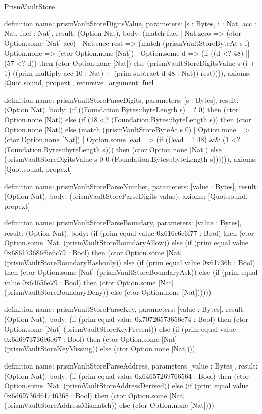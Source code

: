 \begin{lexlean}{PrismVaultStore}
\begin{semanticmodule}
definition{
  name: prismVaultStoreDigitsValue,
  parameters: [s : Bytes, i : Nat, acc : Nat, fuel : Nat],
  result: (Option Nat),
  body: (match fuel
    | Nat.zero => (ctor Option.some [Nat] acc)
    | Nat.succ rest => (match (prismVaultStoreByteAt s i)
      | Option.none => (ctor Option.none [Nat])
      | Option.some d => (if ((d <? 48) || (57 <? d)) then (ctor Option.none [Nat]) else (prismVaultStoreDigitsValue s (i + 1) ((prim multiply acc 10 : Nat) + (prim subtract d 48 : Nat)) rest)))),
  axioms: [Quot.sound, propext],
  recursive_argument: fuel
}

definition{
  name: prismVaultStoreParseDigits,
  parameters: [s : Bytes],
  result: (Option Nat),
  body: (if ((Foundation.Bytes::byteLength s) =? 0) then (ctor Option.none [Nat]) else (if (18 <? (Foundation.Bytes::byteLength s)) then (ctor Option.none [Nat]) else (match (prismVaultStoreByteAt s 0)
    | Option.none => (ctor Option.none [Nat])
    | Option.some lead => (if ((lead =? 48) && (1 <? (Foundation.Bytes::byteLength s))) then (ctor Option.none [Nat]) else (prismVaultStoreDigitsValue s 0 0 (Foundation.Bytes::byteLength s)))))),
  axioms: [Quot.sound, propext]
}

definition{
  name: prismVaultStoreParseNumber,
  parameters: [value : Bytes],
  result: (Option Nat),
  body: (prismVaultStoreParseDigits value),
  axioms: [Quot.sound, propext]
}

definition{
  name: prismVaultStoreParseBoundary,
  parameters: [value : Bytes],
  result: (Option Nat),
  body: (if (prim equal value 0x616c6c6f77 : Bool) then (ctor Option.some [Nat] (prismVaultStoreBoundaryAllow)) else (if (prim equal value 0x686173686f6e6c79 : Bool) then (ctor Option.some [Nat] (prismVaultStoreBoundaryHashonly)) else (if (prim equal value 0x61736b : Bool) then (ctor Option.some [Nat] (prismVaultStoreBoundaryAsk)) else (if (prim equal value 0x64656e79 : Bool) then (ctor Option.some [Nat] (prismVaultStoreBoundaryDeny)) else (ctor Option.none [Nat])))))
}

definition{
  name: prismVaultStoreParseKey,
  parameters: [value : Bytes],
  result: (Option Nat),
  body: (if (prim equal value 0x70726573656e74 : Bool) then (ctor Option.some [Nat] (prismVaultStoreKeyPresent)) else (if (prim equal value 0x6d697373696e67 : Bool) then (ctor Option.some [Nat] (prismVaultStoreKeyMissing)) else (ctor Option.none [Nat])))
}

definition{
  name: prismVaultStoreParseAddress,
  parameters: [value : Bytes],
  result: (Option Nat),
  body: (if (prim equal value 0x64657269766564 : Bool) then (ctor Option.some [Nat] (prismVaultStoreAddressDerived)) else (if (prim equal value 0x6d69736d61746368 : Bool) then (ctor Option.some [Nat] (prismVaultStoreAddressMismatch)) else (ctor Option.none [Nat])))
}


\end{semanticmodule}
\end{lexlean}
